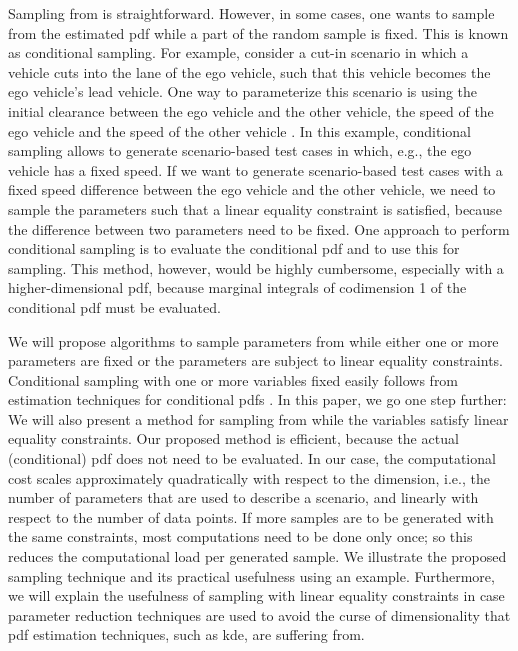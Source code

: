 Sampling from  is straightforward.
However, in some cases, one wants to sample from the estimated \ac{pdf} while a part of the random sample is fixed.
This is known as conditional sampling. 
\cstarta For example, consider a cut-in scenario in which a vehicle cuts into the lane of the ego vehicle, such that this vehicle becomes the ego vehicle's lead vehicle.
One way to parameterize this scenario is using the initial clearance between the ego vehicle and the other vehicle, the speed of the ego vehicle and the speed of the other vehicle \autocite{degelder2019risk}.
In this example, conditional sampling allows to generate scenario-based test cases in which, e.g., the ego vehicle has a fixed speed. 
If we want to generate scenario-based test cases with a fixed speed difference between the ego vehicle and the other vehicle, we need to sample the parameters such that a linear equality constraint is satisfied, because the difference between two parameters need to be fixed. \cenda
One approach to perform conditional sampling is to evaluate the conditional \ac{pdf} and to use this for sampling.
This method, however, would be highly cumbersome, especially with a higher-dimensional \ac{pdf}\cstarta, because marginal integrals of codimension 1 of the conditional \ac{pdf} must be evaluated\cenda. 

We will propose algorithms to sample parameters from  while either one or more parameters are fixed or the parameters are subject to linear equality constraints.
Conditional sampling with one or more variables fixed easily follows from estimation techniques for conditional \acp{pdf} \autocite{hyndman1996estimating, holmes2007fast}.
In this paper, we go one step further: We will also present a method for sampling from  while the variables satisfy linear equality constraints. 
\cstarta Our proposed method is efficient, because the actual (conditional) \ac{pdf} does not need to be evaluated. \cenda
In our case, the computational cost scales approximately quadratically with respect to the dimension, i.e., the number of parameters that are used to describe a scenario, and linearly with respect to the number of data points. 
If more samples are to be generated with the same constraints, most computations need to be done only once; so this reduces the computational load per generated sample.
We illustrate the proposed sampling technique and its practical usefulness using an example.
Furthermore, we will explain the usefulness of sampling with linear equality constraints in case parameter reduction techniques are used to avoid the curse of dimensionality that \ac{pdf} estimation techniques, such as \ac{kde}, are suffering from.


